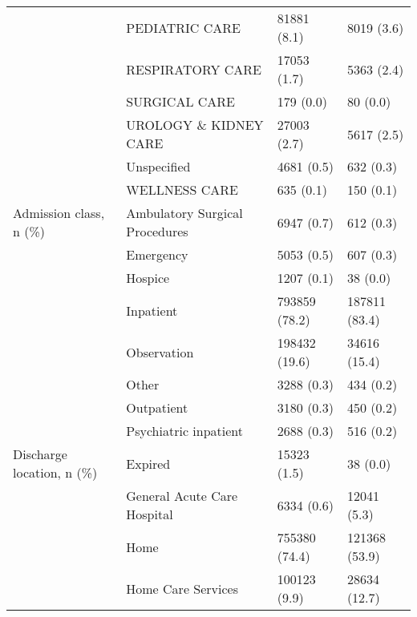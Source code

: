 \begin{tabular}{llll}
                                       & PEDIATRIC CARE &                    81881 (8.1) &        8019 (3.6) \\
                                       & RESPIRATORY CARE &                    17053 (1.7) &        5363 (2.4) \\
                                       & SURGICAL CARE &                      179 (0.0) &          80 (0.0) \\
                                       & UROLOGY \& KIDNEY CARE &                    27003 (2.7) &        5617 (2.5) \\
                                       & Unspecified &                     4681 (0.5) &         632 (0.3) \\
                                       & WELLNESS CARE &                      635 (0.1) &         150 (0.1) \\
Admission class, n (\%) & Ambulatory Surgical Procedures &                     6947 (0.7) &         612 (0.3) \\
                                       & Emergency &                     5053 (0.5) &         607 (0.3) \\
                                       & Hospice &                     1207 (0.1) &          38 (0.0) \\
                                       & Inpatient &                  793859 (78.2) &     187811 (83.4) \\
                                       & Observation &                  198432 (19.6) &      34616 (15.4) \\
                                       & Other &                     3288 (0.3) &         434 (0.2) \\
                                       & Outpatient &                     3180 (0.3) &         450 (0.2) \\
                                       & Psychiatric inpatient &                     2688 (0.3) &         516 (0.2) \\
Discharge location, n (\%) & Expired &                    15323 (1.5) &          38 (0.0) \\
                                       & General Acute Care Hospital &                     6334 (0.6) &       12041 (5.3) \\
                                       & Home &                  755380 (74.4) &     121368 (53.9) \\
                                       & Home Care Services &                   100123 (9.9) &      28634 (12.7) \\

\end{tabular}
